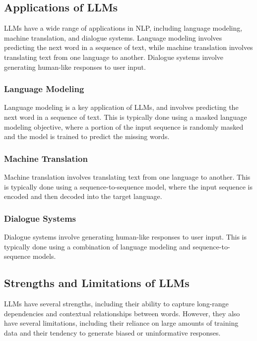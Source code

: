 \documentclass{article}
\begin{document}
\subsection{Applications of LLMs}

LLMs have a wide range of applications in NLP, including language modeling, machine translation, and dialogue systems. Language modeling involves predicting the next word in a sequence of text, while machine translation involves translating text from one language to another. Dialogue systems involve generating human-like responses to user input.

\subsubsection{Language Modeling}

Language modeling is a key application of LLMs, and involves predicting the next word in a sequence of text. This is typically done using a masked language modeling objective, where a portion of the input sequence is randomly masked and the model is trained to predict the missing words.

\subsubsection{Machine Translation}

Machine translation involves translating text from one language to another. This is typically done using a sequence-to-sequence model, where the input sequence is encoded and then decoded into the target language.

\subsubsection{Dialogue Systems}

Dialogue systems involve generating human-like responses to user input. This is typically done using a combination of language modeling and sequence-to-sequence models.

\subsection{Strengths and Limitations of LLMs}

LLMs have several strengths, including their ability to capture long-range dependencies and contextual relationships between words. However, they also have several limitations, including their reliance on large amounts of training data and their tendency to generate biased or uninformative responses.
\end{document}
